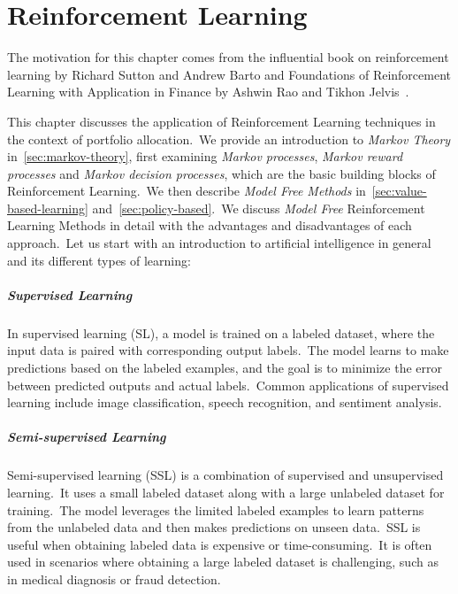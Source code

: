 \documentclass[../xlapes02]{subfiles}
\begin{document}
    \chapter{Reinforcement Learning}\label{ch:reinforcement-learning}
    The motivation for this chapter comes from the influential book on reinforcement learning by Richard Sutton and Andrew Barto and Foundations of Reinforcement Learning with Application in Finance by Ashwin Rao and Tikhon Jelvis~\cite{rao2022foundations, sutton2018reinforcement}.

    This chapter discusses the application of Reinforcement Learning techniques in the context of portfolio allocation.\ We provide an introduction to \emph{Markov Theory} in~\cref{sec:markov-theory}, first examining \emph{Markov processes}, \emph{Markov reward processes} and \emph{Markov decision processes}, which are the basic building blocks of Reinforcement Learning.\ We then describe \emph{Model Free Methods} in~\cref{sec:value-based-learning} and~\cref{sec:policy-based}.\ We discuss \emph{Model Free} Reinforcement Learning Methods in detail with the advantages and disadvantages of each approach.\ Let us start with an introduction to artificial intelligence in general and its different types of learning:

    \paragraph{Supervised Learning}\label{par:supervised-learning}
    In supervised learning (SL), a model is trained on a labeled dataset, where the input data is paired with corresponding output labels.\ The model learns to make predictions based on the labeled examples, and the goal is to minimize the error between predicted outputs and actual labels.\ Common applications of supervised learning include image classification, speech recognition, and sentiment analysis.

    \paragraph{Semi-supervised Learning}\label{par:semi-supervised-learning}
    Semi-supervised learning (SSL) is a combination of supervised and unsupervised learning.\ It uses a small labeled dataset along with a large unlabeled dataset for training.\ The model leverages the limited labeled examples to learn patterns from the unlabeled data and then makes predictions on unseen data.\ SSL is useful when obtaining labeled data is expensive or time-consuming.\ It is often used in scenarios where obtaining a large labeled dataset is challenging, such as in medical diagnosis or fraud detection.
\end{document}

